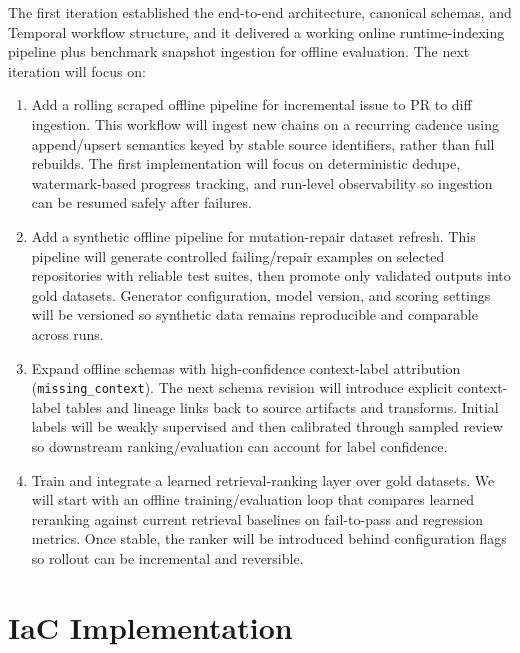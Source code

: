 \documentclass[a4paper,12pt]{article}
\begin{document}
The first iteration established the end-to-end architecture, canonical schemas, and Temporal workflow structure, and it delivered a working online runtime-indexing pipeline plus benchmark snapshot ingestion for offline evaluation. The next iteration will focus on:

\begin{enumerate}
    \item Add a rolling scraped offline pipeline for incremental issue to PR to diff ingestion. This workflow will ingest new chains on a recurring cadence using append/upsert semantics keyed by stable source identifiers, rather than full rebuilds. The first implementation will focus on deterministic dedupe, watermark-based progress tracking, and run-level observability so ingestion can be resumed safely after failures.
    \item Add a synthetic offline pipeline for mutation-repair dataset refresh. This pipeline will generate controlled failing/repair examples on selected repositories with reliable test suites, then promote only validated outputs into gold datasets. Generator configuration, model version, and scoring settings will be versioned so synthetic data remains reproducible and comparable across runs.
    \item Expand offline schemas with high-confidence context-label attribution (\texttt{missing\_context}). The next schema revision will introduce explicit context-label tables and lineage links back to source artifacts and transforms. Initial labels will be weakly supervised and then calibrated through sampled review so downstream ranking/evaluation can account for label confidence.
    \item Train and integrate a learned retrieval-ranking layer over gold datasets. We will start with an offline training/evaluation loop that compares learned reranking against current retrieval baselines on fail-to-pass and regression metrics. Once stable, the ranker will be introduced behind configuration flags so rollout can be incremental and reversible.
\end{enumerate}


%
%
%
%
%

\section{IaC Implementation}
\end{document}
